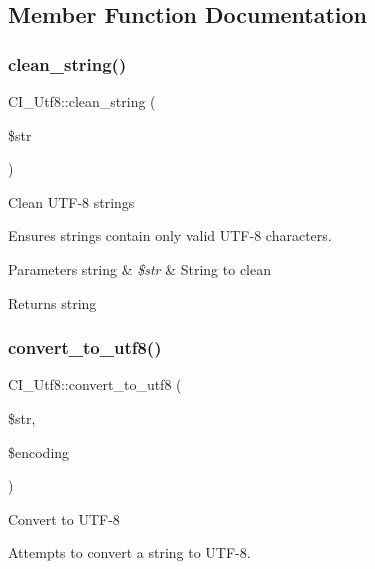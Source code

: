 \subsection{Member Function Documentation}
\mbox{\label{class_c_i___utf8_ad0cc040da9adb399f9ef89f339b691be}} 
\subsubsection{\texorpdfstring{clean\+\_\+string()}{clean\_string()}}
{\footnotesize\ttfamily C\+I\+\_\+\+Utf8\+::clean\+\_\+string (\begin{DoxyParamCaption}\item[{}]{\$str }\end{DoxyParamCaption})}

Clean U\+T\+F-\/8 strings

Ensures strings contain only valid U\+T\+F-\/8 characters.


\begin{DoxyParams}[1]{Parameters}
string & {\em \$str} & String to clean \\
\hline
\end{DoxyParams}
\begin{DoxyReturn}{Returns}
string 
\end{DoxyReturn}
\mbox{\label{class_c_i___utf8_a9c2aa3162f7c478217fc3ed41f33f36a}} 
\subsubsection{\texorpdfstring{convert\+\_\+to\+\_\+utf8()}{convert\_to\_utf8()}}
{\footnotesize\ttfamily C\+I\+\_\+\+Utf8\+::convert\+\_\+to\+\_\+utf8 (\begin{DoxyParamCaption}\item[{}]{\$str,  }\item[{}]{\$encoding }\end{DoxyParamCaption})}

Convert to U\+T\+F-\/8

Attempts to convert a string to U\+T\+F-\/8.


